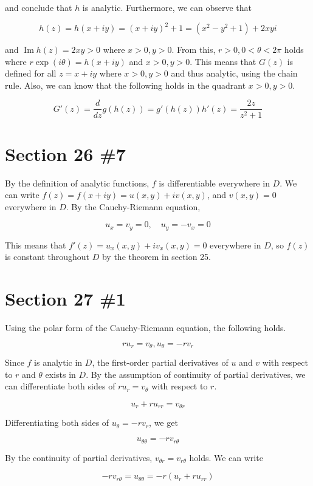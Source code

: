 \documentclass{scrartcl}
\begin{document}
and conclude that \(h\) is analytic.
Furthermore, we can observe that

\[
  h(z) = h(x + iy) = (x + iy)^2 + 1 = (x^2 - y^2 + 1) + 2xyi
\]

and \(\operatorname{Im} h(z) = 2xy > 0\) where \(x > 0, y > 0\).
From this, \(r > 0, 0 < \theta < 2\pi\) holds where \(r\exp(i\theta) = h(x + iy)\) and \(x > 0, y > 0\).
This means that \(G(z)\) is defined for all \(z = x + iy\) where \(x > 0, y > 0\) and thus analytic, using the chain rule.
Also, we can know that the following holds in the quadrant \(x > 0, y > 0\).

\[
  G'(z) = \frac{d}{dz} g(h(z)) = g'(h(z)) h'(z) = \frac{2z}{z^2 + 1}
\]

\section{Section 26 \#7}
By the definition of analytic functions, \(f\) is differentiable everywhere in \(D\).
We can write \(f(z) = f(x + iy) = u(x, y) + iv(x, y)\), and \(v(x, y) = 0\) everywhere in \(D\).
By the Cauchy-Riemann equation,

\[
  u_x = v_y = 0, \quad u_y = -v_x = 0
\]

This means that \(f'(z) = u_x(x, y) + iv_x(x, y) = 0\) everywhere in \(D\), so \(f(z)\) is constant throughout \(D\) by the theorem in section 25.

\section{Section 27 \#1}
Using the polar form of the Cauchy-Riemann equation, the following holds.

\[
  ru_r = v_\theta, u_\theta = -rv_r
\]

Since \(f\) is analytic in \(D\), the first-order partial derivatives of \(u\) and \(v\) with respect to \(r\) and \(\theta\) exists in \(D\).
By the assumption of continuity of partial derivatives, we can differentiate both sides of \(ru_r = v_\theta\) with respect to \(r\).

\[
  u_r + ru_{rr} = v_{\theta r}
\]

Differentiating both sides of \(u_\theta = -rv_r\), we get

\[
  u_{\theta\theta} = -rv_{r\theta}
\]

By the continuity of partial derivatives, \(v_{\theta r} = v_{r\theta}\) holds.
We can write

\[
  -rv_{r\theta} = u_{\theta\theta} = -r(u_r + ru_{rr})
\]
\end{document}
